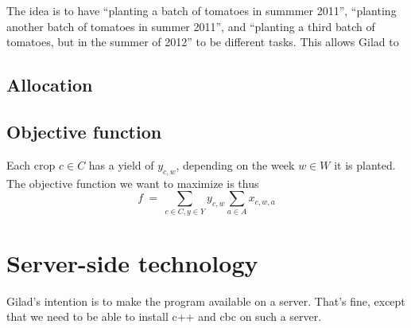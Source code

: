 \documentclass[11pt]{amsart}
\numberwithin{equation}{section}
\begin{document}
The idea
is to have ``planting a batch of tomatoes in summmer 2011'',
``planting another batch of tomatoes in summer 2011'', and ``planting
a third batch of tomatoes, but in the summer of 2012'' to be different
tasks. This allows Gilad to 


\subsection{Allocation}


\subsection{Objective function}

Each crop $c\in C$ has a yield of  $y_{c,w}$, depending on the week
$w\in W$ it is planted. 
The objective function we want to  maximize is thus
\[
   f 
   \ = \
   \sum_{c\in C, y\in Y} y_{c,w} \sum_{a\in A} x_{c,w,a}
\]

\section{Server-side technology}

Gilad's intention is to make the program available on a server. That's
fine, except that we need to be able to install c++ and cbc on such a server.



\end{document}
